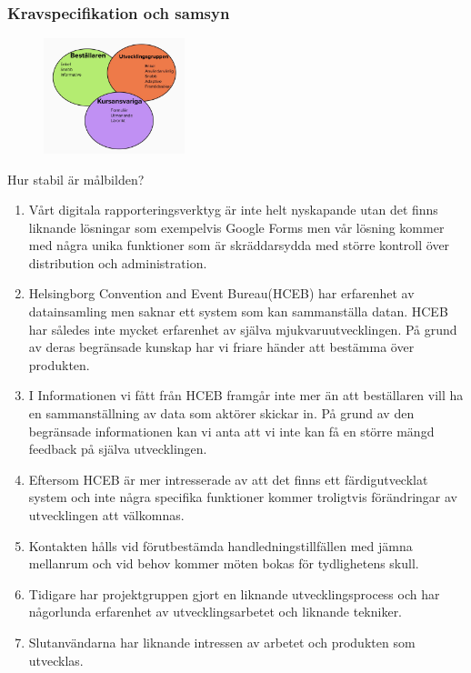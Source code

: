 \documentclass{article}
\begin{document}
\subsubsection{Kravspecifikation och samsyn}

\begin{figure}[htp]
    \centering
    \includegraphics[width = 155px]{malbild.jpg}
    \label{fig:24}
\end{figure}

Hur stabil är målbilden?

\begin{enumerate}
	\item Vårt digitala rapporteringsverktyg är inte helt nyskapande utan det finns liknande
lösningar som exempelvis Google Forms men vår lösning kommer med några unika
funktioner som är skräddarsydda med större kontroll över distribution och
administration. 

	 \item Helsingborg Convention and Event Bureau(HCEB) har erfarenhet av datainsamling
men saknar ett system som kan sammanställa datan. HCEB har således inte
mycket erfarenhet av själva mjukvaruutvecklingen. På grund av deras begränsade kunskap har vi friare händer att bestämma över produkten.

\item I Informationen vi fått från HCEB framgår inte mer än att beställaren vill ha en sammanställning av data som aktörer skickar in. På grund av den begränsade informationen kan vi anta att vi inte kan få en större mängd feedback på själva utvecklingen.

\item Eftersom HCEB är mer intresserade av att det finns ett färdigutvecklat system och
inte några specifika funktioner kommer troligtvis förändringar av utvecklingen att
välkomnas.

\item Kontakten hålls vid förutbestämda handledningstillfällen med jämna mellanrum och
vid behov kommer möten bokas för tydlighetens skull.

\item Tidigare har projektgruppen gjort en liknande utvecklingsprocess och har någorlunda
erfarenhet av utvecklingsarbetet och liknande tekniker.

\item Slutanvändarna har liknande intressen av arbetet och produkten som utvecklas.
\end{enumerate}
\end{document}
